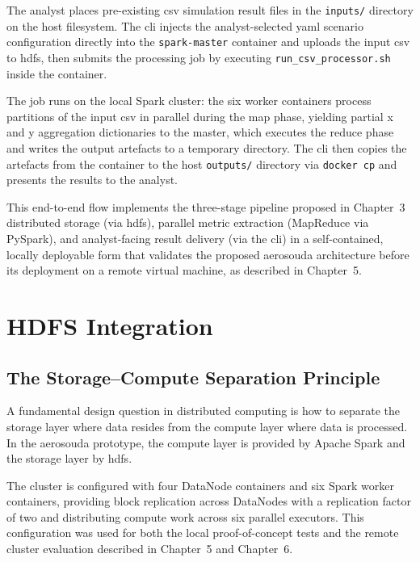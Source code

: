 The analyst places pre-existing \gls{csv} simulation result files in the \texttt{inputs/}
directory on the host filesystem. The \gls{cli} injects the analyst-selected \gls{yaml} scenario
configuration directly into the \texttt{spark-master} container and uploads the input \gls{csv}
to \gls{hdfs}, then submits the processing job by executing \texttt{run\_csv\_processor.sh}
inside the container.

The job runs on the local Spark cluster: the six worker containers process partitions of the
input \gls{csv} in parallel during the map phase, yielding partial x and y aggregation
dictionaries to the master, which executes the reduce phase and writes the output artefacts to a
temporary directory. The \gls{cli} then copies the artefacts from the container to the host
\texttt{outputs/} directory via \texttt{docker cp} and presents the results to the analyst.

This end-to-end flow implements the three-stage pipeline proposed in Chapter~3 distributed
storage (via \gls{hdfs}), parallel metric extraction (MapReduce via PySpark),
and analyst-facing result delivery (via the \gls{cli}) in a self-contained, locally deployable
form that validates the proposed \gls{aerosouda} architecture before its deployment on a remote
virtual machine, as described in Chapter~5.

\section{HDFS Integration}
\label{sec:hdfs-integration}

\subsection{The Storage--Compute Separation Principle}
\label{subsec:cap4-the-storage-compute-separation-principle}

A fundamental design question in distributed computing is how to separate the
storage layer where data resides from the compute layer where data is
processed.  In the \gls{aerosouda} prototype, the compute layer is provided by Apache Spark
and the storage layer by \gls{hdfs}.

The cluster is configured with four DataNode containers and six Spark worker containers,
providing block replication across DataNodes with a replication factor of two and
distributing compute work across six parallel executors.  This configuration was used
for both the local proof-of-concept tests and the remote cluster evaluation described in
Chapter~5 and Chapter~6.

